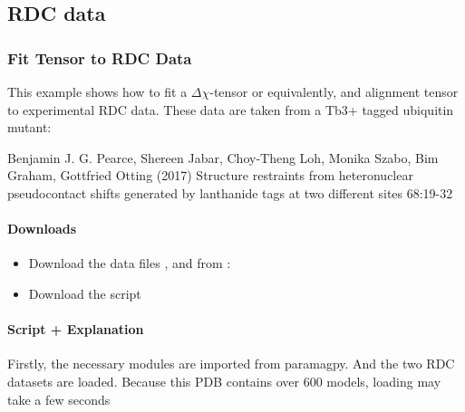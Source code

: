 \documentclass[a4paper,10pt,english,openany,oneside]{sphinxmanual}
\begin{document}
\subsection{RDC data}
\label{\detokenize{examples/index:rdc-data}}

\subsubsection{Fit Tensor to RDC Data}
\label{\detokenize{examples/rdc_fit:fit-tensor-to-rdc-data}}\label{\detokenize{examples/rdc_fit:rdc-fit}}\label{\detokenize{examples/rdc_fit::doc}}
This example shows how to fit a \({\Delta\chi}\)-tensor or equivalently, and alignment tensor to experimental RDC data. These data are taken from a Tb3+ tagged ubiquitin mutant:

Benjamin J. G. Pearce, Shereen Jabar, Choy-Theng Loh, Monika Szabo, Bim Graham, Gottfried Otting (2017) Structure restraints from heteronuclear pseudocontact shifts generated by lanthanide tags at two different sites  68:19-32


\paragraph{Downloads}
\label{\detokenize{examples/rdc_fit:downloads}}\begin{itemize}
\item {} 
Download the data files ,  and  from :

\item {} 
Download the script 

\end{itemize}


\paragraph{Script + Explanation}
\label{\detokenize{examples/rdc_fit:script-explanation}}
Firstly, the necessary modules are imported from paramagpy. And the two RDC datasets are loaded. Because this PDB contains over 600 models, loading may take a few seconds
\end{document}
